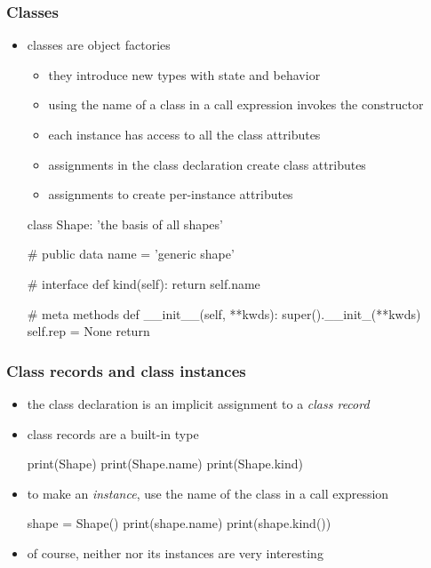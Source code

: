 \begin{frame}[fragile]
%
  \frametitle{Classes}
%
  \begin{itemize}
%
  \item classes are object factories
    \begin{itemize}
    \item they introduce new types with state and behavior
    \item using the name of a class in a call expression invokes the constructor
    \item each instance has access to all the class attributes
    \item assignments in the class declaration create class attributes
    \item assignments to  create per-instance attributes
    \end{itemize}
%
    \begin{ipython}{}
      class Shape:
          'the basis of all shapes'

          # public data
          name = 'generic shape'

          # interface
          def kind(self): return self.name

          # meta methods
          def __init__(self, **kwds):
              super().__init_(**kwds)
              self.rep = None
              return
    \end{ipython}
%
  \end{itemize}
%
\end{frame}

\begin{frame}[fragile]
%
  \frametitle{Class records and class instances}
%
  \begin{itemize}
%
  \item the class declaration is an implicit assignment to a \emph{class record}
  \item class records are a built-in type
    \begin{ipython}{}
      print(Shape)
      print(Shape.name)
      print(Shape.kind)
    \end{ipython}
%
  \item to make an \emph{instance}, use the name of the class in a call expression
    \begin{ipython}{}
      shape = Shape()
      print(shape.name)
      print(shape.kind())
    \end{ipython}
%
  \item of course, neither  nor its instances are very interesting
%
  \end{itemize}
%
\end{frame}

